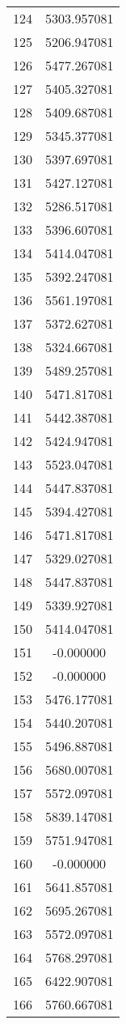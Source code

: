 \documentclass[12pt]{article}
\begin{document}
\begin{longtable}{@{}cc@{}}
124 & 5303.957081 \\
125 & 5206.947081 \\
126 & 5477.267081 \\
127 & 5405.327081 \\
128 & 5409.687081 \\
129 & 5345.377081 \\
130 & 5397.697081 \\
131 & 5427.127081 \\
132 & 5286.517081 \\
133 & 5396.607081 \\
134 & 5414.047081 \\
135 & 5392.247081 \\
136 & 5561.197081 \\
137 & 5372.627081 \\
138 & 5324.667081 \\
139 & 5489.257081 \\
140 & 5471.817081 \\
141 & 5442.387081 \\
142 & 5424.947081 \\
143 & 5523.047081 \\
144 & 5447.837081 \\
145 & 5394.427081 \\
146 & 5471.817081 \\
147 & 5329.027081 \\
148 & 5447.837081 \\
149 & 5339.927081 \\
150 & 5414.047081 \\
151 & -0.000000 \\
152 & -0.000000 \\
153 & 5476.177081 \\
154 & 5440.207081 \\
155 & 5496.887081 \\
156 & 5680.007081 \\
157 & 5572.097081 \\
158 & 5839.147081 \\
159 & 5751.947081 \\
160 & -0.000000 \\
161 & 5641.857081 \\
162 & 5695.267081 \\
163 & 5572.097081 \\
164 & 5768.297081 \\
165 & 6422.907081 \\
166 & 5760.667081 \\

\end{longtable}
\end{document}
